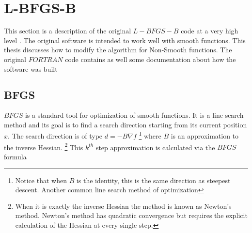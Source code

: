 



\chapter{L-BFGS-B}
\label{ChapterConstraints} %

This section is a description of the original $L-BFGS-B$ code at a very high level \citep{lbfgsbsoftware}. The original software is intended to work well with smooth functions. This thesis discusses how to modify the algorithm for Non-Smooth functions. The original $FORTRAN$ code contains as well some documentation \citep{codepaper} about how the software was built

\section{BFGS}

$BFGS$ is a standard tool for optimization of smooth functions.\citep{nocedal} It is a line search method and its goal is to find a search direction starting from its current position $x$. The search direction is of type $d = -B \nabla f$ \footnote{Notice that when $B$ is the identity, this is the same direction as steepest descent. Another common line search method of optimization} where $B$ is an approximation to the inverse Hessian. \footnote{When it is exactly the inverse Hessian the method is known as Newton's method. Newton's method has quadratic convergence but requires the explicit calculation of the Hessian at every single step.} This $k^{th}$ step approximation is calculated via the $BFGS$ formula

